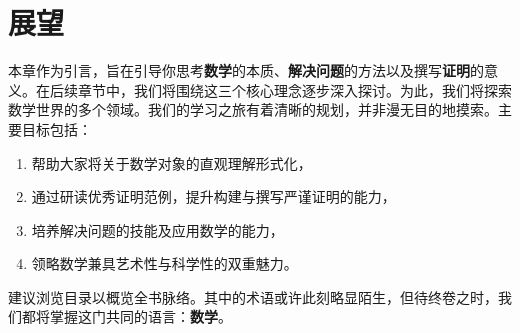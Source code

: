\section{展望}\label{sec:section1.6}

本章作为引言，旨在引导你思考\textbf{数学}的本质、\textbf{解决问题}的方法以及撰写\textbf{证明}的意义。在后续章节中，我们将围绕这三个核心理念逐步深入探讨。为此，我们将探索数学世界的多个领域。我们的学习之旅有着清晰的规划，并非漫无目的地摸索。主要目标包括：

\begin{enumerate}
    \item 帮助大家将关于数学对象的直观理解形式化，
    \item 通过研读优秀证明范例，提升构建与撰写严谨证明的能力，
    \item 培养解决问题的技能及应用数学的能力，
    \item 领略数学兼具艺术性与科学性的双重魅力。
\end{enumerate}

建议浏览目录以概览全书脉络。其中的术语或许此刻略显陌生，但待终卷之时，我们都将掌握这门共同的语言：\textbf{数学}。